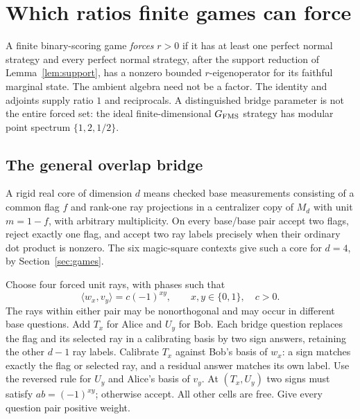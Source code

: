 \section{Which ratios finite games can force}\label{sec:ratios}
\begin{definition}\label{def:forced}
A finite binary-scoring game \emph{forces} $r>0$ if it has at least one perfect normal strategy and every perfect normal strategy, after the support reduction of Lemma~\ref{lem:support}, has a nonzero bounded $r$-eigenoperator for its faithful marginal state. The ambient algebra need not be a factor. The identity and adjoints supply ratio $1$ and reciprocals. A distinguished bridge parameter is not the entire forced set: the ideal finite-dimensional $G_{\mathrm{FMS}}$ strategy has modular point spectrum $\{1,2,1/2\}$.
\end{definition}

\subsection{The general overlap bridge}
A rigid real core of dimension $d$ means checked base measurements consisting of a common flag $f$ and rank-one ray projections in a centralizer copy of $M_d$ with unit $m=1-f$, with arbitrary multiplicity. On every base/base pair accept two flags, reject exactly one flag, and accept two ray labels precisely when their ordinary dot product is nonzero. The six magic-square contexts give such a core for $d=4$, by Section~\ref{sec:games}.

Choose four forced unit rays, with phases such that
\[
 \langle w_x,v_y\rangle=c(-1)^{xy},\qquad x,y\in\{0,1\},\quad c>0.
\]
The rays within either pair may be nonorthogonal and may occur in different base questions. Add $T_x$ for Alice and $U_y$ for Bob. Each bridge question replaces the flag and its selected ray in a calibrating basis by two sign answers, retaining the other $d-1$ ray labels. Calibrate $T_x$ against Bob's basis of $w_x$: a sign matches exactly the flag or selected ray, and a residual answer matches its own label. Use the reversed rule for $U_y$ and Alice's basis of $v_y$. At $(T_x,U_y)$ two signs must satisfy $ab=(-1)^{xy}$; otherwise accept. All other cells are free. Give every question pair positive weight.


